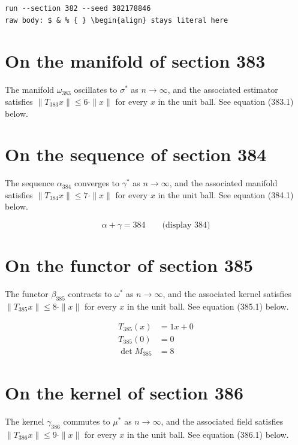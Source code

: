 \documentclass{article}
\begin{document}
\begin{verbatim}
run --section 382 --seed 382178846
raw body: $ & % { } \begin{align} stays literal here
\end{verbatim}

\section{On the manifold of section 383}
The manifold $\omega_{383}$ oscillates to $\sigma^{*}$ as $n \to \infty$,
and the associated estimator satisfies $\|T_{383} x\| \leq 6 \cdot \|x\|$
for every $x$ in the unit ball. See equation (383.1) below.

\section{On the sequence of section 384}
The sequence $\alpha_{384}$ converges to $\gamma^{*}$ as $n \to \infty$,
and the associated manifold satisfies $\|T_{384} x\| \leq 7 \cdot \|x\|$
for every $x$ in the unit ball. See equation (384.1) below.

$$
\alpha + \gamma = 384 \qquad \text{(display 384)}
$$

\section{On the functor of section 385}
The functor $\beta_{385}$ contracts to $\omega^{*}$ as $n \to \infty$,
and the associated kernel satisfies $\|T_{385} x\| \leq 8 \cdot \|x\|$
for every $x$ in the unit ball. See equation (385.1) below.

\begin{align}
T_{385}(x) &= 1 x + 0 \\
T_{385}(0) &= 0 \\
\det M_{385} &= 8
\end{align}

\section{On the kernel of section 386}
The kernel $\gamma_{386}$ commutes to $\mu^{*}$ as $n \to \infty$,
and the associated field satisfies $\|T_{386} x\| \leq 9 \cdot \|x\|$
for every $x$ in the unit ball. See equation (386.1) below.
\end{document}
